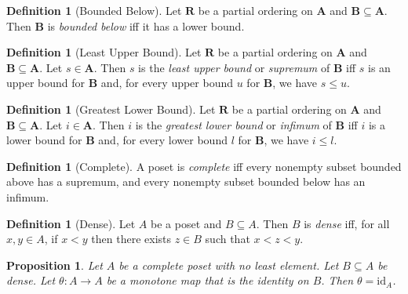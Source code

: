 \documentclass{book}
\newtheorem{prop}[ax]{Proposition}
\theoremstyle{definition}
\newtheorem{df}[ax]{Definition}
\begin{document}
\begin{df}[Bounded Below]
Let $\mathbf{R}$ be a partial ordering on $\mathbf{A}$ and $\mathbf{B} \subseteq \mathbf{A}$. Then $\mathbf{B}$ is \emph{bounded below} iff it has a lower bound.
\end{df}

\begin{df}[Least Upper Bound]
Let $\mathbf{R}$ be a partial ordering on $\mathbf{A}$ and $\mathbf{B} \subseteq \mathbf{A}$. Let $s \in \mathbf{A}$. Then $s$ is the \emph{least upper bound} or \emph{supremum} of $\mathbf{B}$ iff $s$ is an upper bound for $\mathbf{B}$ and, for every upper bound $u$ for $\mathbf{B}$, we have $s \leq u$.
\end{df}

\begin{df}[Greatest Lower Bound]
Let $\mathbf{R}$ be a partial ordering on $\mathbf{A}$ and $\mathbf{B} \subseteq \mathbf{A}$. Let $i \in \mathbf{A}$. Then $i$ is the \emph{greatest lower bound} or \emph{infimum} of $\mathbf{B}$ iff $i$ is a lower bound for $\mathbf{B}$ and, for every lower bound $l$ for $\mathbf{B}$, we have $i \leq l$.
\end{df}

\begin{df}[Complete]
A poset is \emph{complete} iff every nonempty subset bounded above has a supremum, and every nonempty subset bounded below has an infimum.
\end{df}

\begin{df}[Dense]
Let $A$ be a poset and $B \subseteq A$. Then $B$ is \emph{dense} iff, for all $x,y \in A$, if $x < y$ then there exists $z \in B$ such that $x < z < y$.
\end{df}

\begin{prop}
\label{prop:orderisoid}
Let $A$ be a complete poset with no least element. Let $B \subseteq A$ be dense. Let $\theta : A \rightarrow A$ be a monotone map that is the identity on $B$. Then $\theta = \mathrm{id}_A$.
\end{prop}
\end{document}
